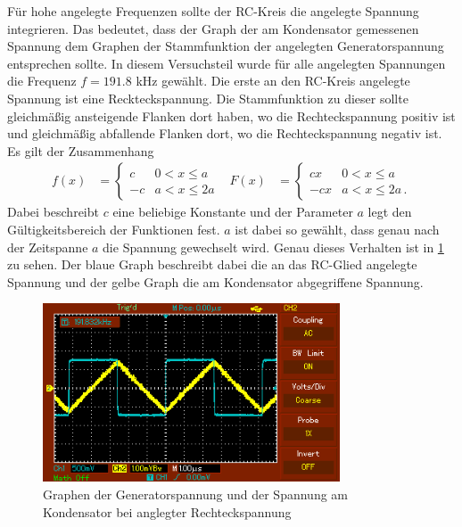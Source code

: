 Für hohe angelegte Frequenzen sollte der RC-Kreis die angelegte Spannung integrieren.
Das bedeutet, dass der Graph der am Kondensator gemessenen Spannung dem Graphen der
Stammfunktion der angelegten Generatorspannung entsprechen sollte. In diesem Versuchsteil
wurde für alle angelegten Spannungen die Frequenz $f=191.8$ kHz gewählt.
Die erste an den RC-Kreis angelegte Spannung ist eine Reckteckspannung. Die Stammfunktion
zu dieser sollte gleichmäßig ansteigende Flanken dort haben, wo die Rechteckspannung
positiv ist und gleichmäßig abfallende Flanken dort, wo die Rechteckspannung
negativ ist. Es gilt der Zusammenhang
\begin{align}
  f(x)&=
  \begin{cases}
    c & 0<x\leq a\\
    -c & a<x\leq 2a
  \end{cases}
  & F(x)&=
  \begin{cases}
    c x & 0<x\leq a\\
    -c x & a<x\leq 2a   \,.
  \end{cases}
\end{align}
Dabei beschreibt $c$ eine beliebige Konstante und der Parameter $a$ legt den Gültigkeitsbereich
der Funktionen fest. $a$ ist dabei so gewählt, dass genau nach der Zeitspanne $a$ die
Spannung gewechselt wird.
Genau dieses Verhalten ist in \ref{fig:rechteck} zu sehen. Der blaue Graph beschreibt
dabei die an das RC-Glied angelegte Spannung und der gelbe Graph die am Kondensator
abgegriffene Spannung.
\begin{figure}
  \centering
  \includegraphics[width=250pt]{data/integration_rechteck.PNG}
  \caption{Graphen der Generatorspannung und der Spannung am Kondensator bei anglegter
  Rechteckspannung}
  \label{fig:rechteck}
\end{figure}


